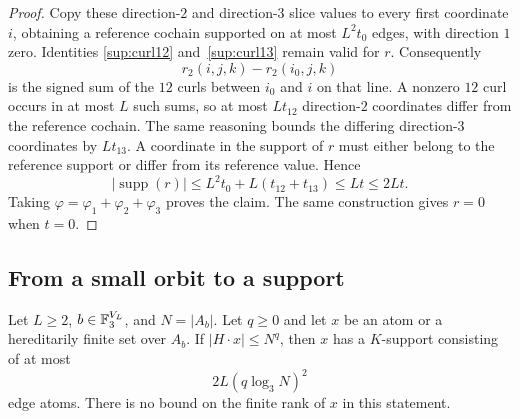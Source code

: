 \begin{proof}
Copy these direction-$2$ and direction-$3$ slice values to every first
coordinate $i$, obtaining a reference cochain supported on at most
$L^2t_0$ edges, with direction $1$ zero. Identities
\eqref{sup:curl12} and~\eqref{sup:curl13} remain valid for $r$.
Consequently
\[
 r_2(i,j,k)-r_2(i_0,j,k)
\]
is the signed sum of the $12$ curls between $i_0$ and $i$ on that line.
A nonzero $12$ curl occurs in at most $L$ such sums, so at most
$Lt_{12}$ direction-$2$ coordinates differ from the reference cochain.
The same reasoning bounds the differing direction-$3$ coordinates by
$Lt_{13}$. A coordinate in the support of $r$ must either belong to
the reference support or differ from its reference value. Hence
\[
 |\operatorname{supp}(r)|
 \le L^2t_0+L(t_{12}+t_{13})\le Lt\le2Lt.
\]
Taking $\varphi=\varphi_1+\varphi_2+\varphi_3$ proves the claim. The
same construction gives $r=0$ when $t=0$.
\end{proof}

\subsection{From a small orbit to a support}

\begin{proposition}\label{sup:small-orbit}
Let $L\ge2$, $b\in\mathbb F_3^{V_L}$, and $N=|A_b|$. Let $q\ge0$ and let $x$
be an atom or a hereditarily finite set over $A_b$. If
$|H\cdot x|\le N^q$, then $x$ has a $K$-support consisting of at most
\[
 2L(q\log_3N)^2
\]
edge atoms. There is no bound on the finite rank of $x$ in this statement.
\end{proposition}

